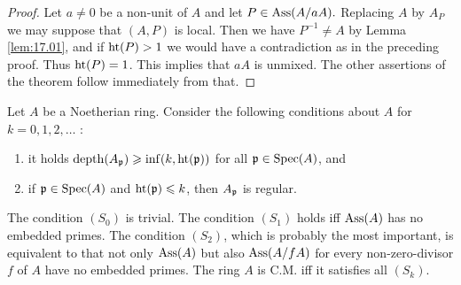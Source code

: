 \documentclass[../main]{subfiles}
\begin{document}
\begin{proof}
Let $a\neq 0$ be a non-unit of $A$ and let $P \in\operatorname{Ass}(A / a A) .$ Replacing $A$ by $A_P$ we may suppose that $(A, P)$ is local. Then we have $P^{-1} \neq A$ by Lemma \ref{lem:17.01}, and if $\operatorname{ht}(P)>1$ we would have a contradiction as in the preceding proof. Thus $\operatorname{ht}(P)=1$. This implies that $aA$ is unmixed. The other assertions of the theorem follow immediately from that.
\end{proof}

\newparagraph Let $A$ be a Noetherian ring. Consider the following conditions about $A$ for $k=0,1,2, \ldots$ : 
\begin{enumerate}
    \item[$(S_k)$] it holds $\operatorname{depth} (A_{\mathfrak{p}}) \geqslant \inf (k, \operatorname{ht}(\mathfrak{p}))$ for all $\mathfrak{p} \in \operatorname{Spec}(A)$, and
    \item[$(R_k)$] if $\mathfrak{p} \in \operatorname{Spec}(A)$ and $\operatorname{ht}(\mathfrak{p}) \leqslant k$, then $A_{\mathfrak{p}}$ is regular.
\end{enumerate}
 The condition $(S_0)$ is trivial. The condition $(S_1)$ holds iff $\operatorname{Ass}(A)$ has no embedded primes. The condition $(S_2)$, which is probably the most important, is equivalent to that not only $\operatorname{Ass}(A)$ but also $\operatorname{Ass}(A/fA)$ for every non-zero-divisor $f$ of $A$ have no embedded primes. The ring $A$ is C.M. iff it satisfies all $(S_k)$.
 
\end{document}
